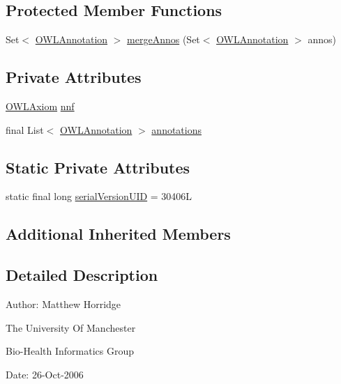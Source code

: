 \subsection*{Protected Member Functions}
\begin{DoxyCompactItemize}
\item 
Set$<$ \hyperlink{interfaceorg_1_1semanticweb_1_1owlapi_1_1model_1_1_o_w_l_annotation}{O\-W\-L\-Annotation} $>$ \hyperlink{classuk_1_1ac_1_1manchester_1_1cs_1_1owl_1_1owlapi_1_1_o_w_l_axiom_impl_afd407dde14be90b28413ddfe8f264092}{merge\-Annos} (Set$<$ \hyperlink{interfaceorg_1_1semanticweb_1_1owlapi_1_1model_1_1_o_w_l_annotation}{O\-W\-L\-Annotation} $>$ annos)
\end{DoxyCompactItemize}
\subsection*{Private Attributes}
\begin{DoxyCompactItemize}
\item 
\hyperlink{interfaceorg_1_1semanticweb_1_1owlapi_1_1model_1_1_o_w_l_axiom}{O\-W\-L\-Axiom} \hyperlink{classuk_1_1ac_1_1manchester_1_1cs_1_1owl_1_1owlapi_1_1_o_w_l_axiom_impl_ac6cc3b4b7ac33a4d285b8e1db7b939c4}{nnf}
\item 
final List$<$ \hyperlink{interfaceorg_1_1semanticweb_1_1owlapi_1_1model_1_1_o_w_l_annotation}{O\-W\-L\-Annotation} $>$ \hyperlink{classuk_1_1ac_1_1manchester_1_1cs_1_1owl_1_1owlapi_1_1_o_w_l_axiom_impl_af6fbf6188f7bdcdc6bef5766feed695e}{annotations}
\end{DoxyCompactItemize}
\subsection*{Static Private Attributes}
\begin{DoxyCompactItemize}
\item 
static final long \hyperlink{classuk_1_1ac_1_1manchester_1_1cs_1_1owl_1_1owlapi_1_1_o_w_l_axiom_impl_a33b620fcc431f2bd5ebc6c94f5f141e9}{serial\-Version\-U\-I\-D} = 30406\-L
\end{DoxyCompactItemize}
\subsection*{Additional Inherited Members}


\subsection{Detailed Description}
Author\-: Matthew Horridge\par
 The University Of Manchester\par
 Bio-\/\-Health Informatics Group\par
 Date\-: 26-\/\-Oct-\/2006\par
 \par
 

